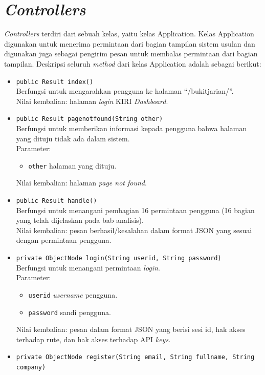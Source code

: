 \section{\textit{Controllers}}
\label{sec:controllerssrancangan}
\textit{Controllers} terdiri dari sebuah kelas, yaitu kelas Application. Kelas Application digunakan untuk menerima permintaan dari bagian tampilan sistem usulan dan digunakan juga sebagai pengirim pesan untuk membalas permintaan dari bagian tampilan. Deskripsi seluruh \textit{method} dari kelas Application adalah sebagai berikut:
\begin{itemize}
	\item \texttt{public Result index()}\\
	Berfungsi untuk mengarahkan pengguna ke halaman ``/bukitjarian/''.\\
	Nilai kembalian: halaman \textit{login} KIRI \textit{Dashboard}.
	\item \texttt{public Result pagenotfound(String other)}\\
	Berfungsi untuk memberikan informasi kepada pengguna bahwa halaman yang dituju tidak ada dalam sistem.\\
	Parameter:
	\begin{itemize}
		\item \texttt{other} halaman yang dituju.
	\end{itemize}
	Nilai kembalian: halaman \textit{page not found}.
	\item \texttt{public Result handle()}\\
	Berfungsi untuk menangani pembagian 16 permintaan pengguna (16 bagian yang telah dijelaskan pada bab analisis).\\
	Nilai kembalian: pesan berhasil/kesalahan dalam format JSON yang sesuai dengan permintaan pengguna.
	\item \texttt{private ObjectNode login(String userid, String password)}\\
	Berfungsi untuk menangani permintaan \textit{login}.\\
	Parameter:
	\begin{itemize}
		\item \texttt{userid} \textit{username} pengguna.
		\item \texttt{password} sandi pengguna.
	\end{itemize}
	Nilai kembalian: pesan dalam format JSON yang berisi sesi id, hak akses terhadap rute, dan hak akses terhadap API \textit{keys}.
	\item \texttt{private ObjectNode register(String email, String fullname, String company)}\\

\end{itemize}
